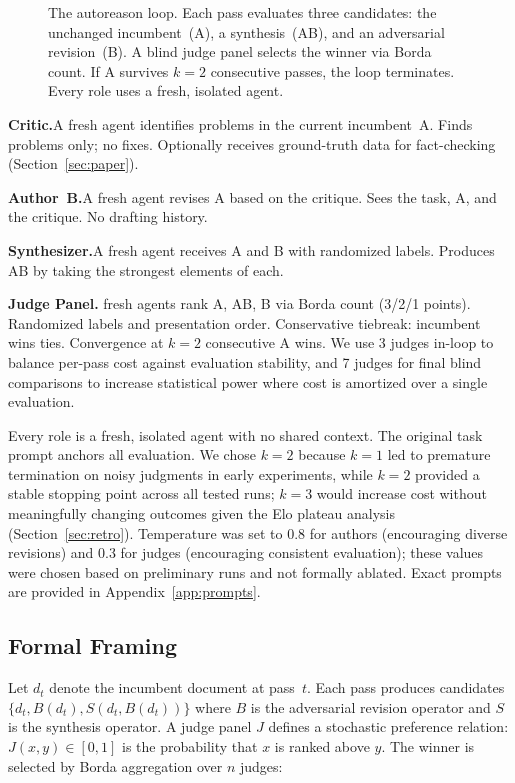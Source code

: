 \documentclass[10pt,twocolumn]{article}
\begin{document}
\begin{figure}[t]
\begin{tikzpicture}
\end{tikzpicture}
\caption{The autoreason loop. Each pass evaluates three candidates: the unchanged incumbent~(A), a synthesis~(AB), and an adversarial revision~(B). A blind judge panel selects the winner via Borda count. If A survives $k{=}2$ consecutive passes, the loop terminates. Every role uses a fresh, isolated agent.}
\label{fig:method}
\end{figure}

\textbf{Critic.}\enspace A fresh agent identifies problems in the current incumbent~A. Finds problems only; no fixes. Optionally receives ground-truth data for fact-checking (Section~\ref{sec:paper}).

\textbf{Author~B.}\enspace A fresh agent revises A based on the critique. Sees the task, A, and the critique. No drafting history.

\textbf{Synthesizer.}\enspace A fresh agent receives A and B with randomized labels. Produces AB by taking the strongest elements of each.

\textbf{Judge Panel.} fresh agents rank A, AB, B via Borda count (3/2/1 points). Randomized labels and presentation order. Conservative tiebreak: incumbent wins ties. Convergence at $k{=}2$ consecutive A wins. We use 3 judges in-loop to balance per-pass cost against evaluation stability, and 7 judges for final blind comparisons to increase statistical power where cost is amortized over a single evaluation.

Every role is a fresh, isolated agent with no shared context. The original task prompt anchors all evaluation. We chose $k{=}2$ because $k{=}1$ led to premature termination on noisy judgments in early experiments, while $k{=}2$ provided a stable stopping point across all tested runs; $k{=}3$ would increase cost without meaningfully changing outcomes given the Elo plateau analysis (Section~\ref{sec:retro}). Temperature was set to 0.8 for authors (encouraging diverse revisions) and 0.3 for judges (encouraging consistent evaluation); these values were chosen based on preliminary runs and not formally ablated. Exact prompts are provided in Appendix~\ref{app:prompts}.

\subsection{Formal Framing}

Let $d_t$ denote the incumbent document at pass~$t$. Each pass produces candidates $\{d_t, B(d_t), S(d_t, B(d_t))\}$ where $B$ is the adversarial revision operator and $S$ is the synthesis operator. A judge panel $J$ defines a stochastic preference relation: $J(x, y) \in [0,1]$ is the probability that $x$ is ranked above $y$. The winner is selected by Borda aggregation over $n$ judges:
\end{document}
